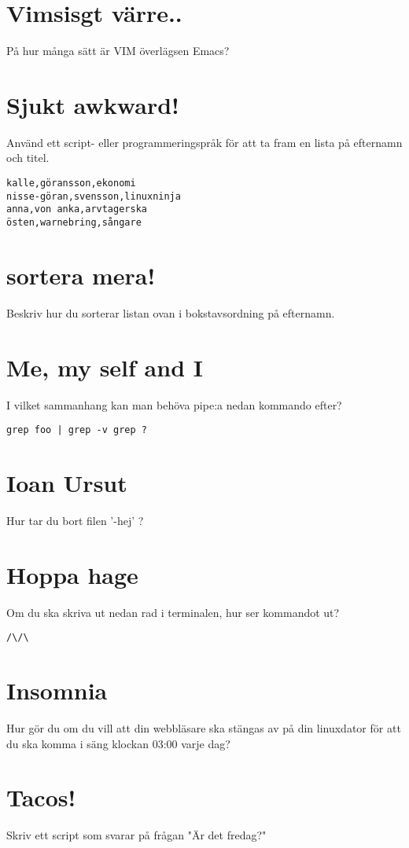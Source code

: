 \documentclass[a4paper]{report}
\begin{document}
\section{Vimsisgt värre..}
På hur många sätt är VIM överlägsen Emacs?

\section{Sjukt awkward!}
Använd ett script- eller programmeringspråk för att ta fram en lista på efternamn och titel.
\begin{verbatim}
kalle,göransson,ekonomi
nisse-göran,svensson,linuxninja
anna,von anka,arvtagerska
östen,warnebring,sångare
\end{verbatim}

\section{sortera mera!}
Beskriv hur du sorterar listan ovan i bokstavsordning på efternamn.

\section{Me, my self and I}
I vilket sammanhang kan man behöva pipe:a nedan kommando efter? 
\begin{verbatim}
grep foo | grep -v grep ?
\end{verbatim}

\section{Ioan Ursut}
Hur tar du bort filen '-hej' ?

\section{Hoppa hage}
Om du ska skriva ut nedan rad i terminalen, hur ser kommandot ut? 
\begin{verbatim}
/\/\
\end{verbatim}

\section{Insomnia}
Hur gör du om du vill att din webbläsare ska stängas av på din linuxdator för att du ska komma i säng klockan 03:00 varje dag?

\section{Tacos!}
Skriv ett script som svarar på frågan "Är det fredag?"
\end{document}
